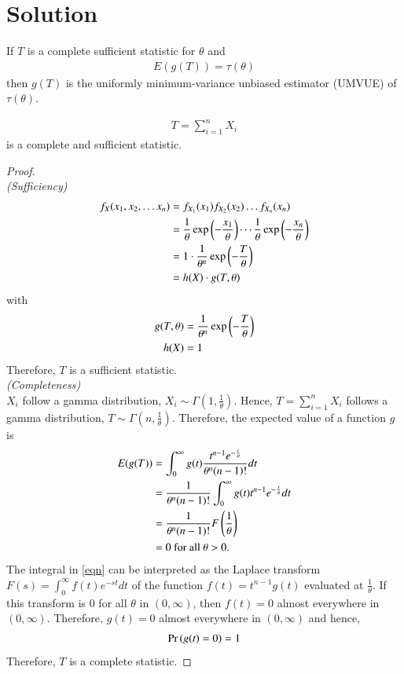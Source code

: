\documentclass[journal,12pt,twocolumn]{IEEEtran}
\begin{document}
\section{Solution}
\begin{theorem}
If $T$ is a complete sufficient statistic for $\theta$ and 
\begin{align}
\label{eqn 2.0.1}
E(g(T)) = \tau(\theta)
\end{align}
then $g(T)$ is the uniformly minimum-variance unbiased estimator (UMVUE) of $\tau(\theta)$.\\
\end{theorem}
\begin{lemma}
\begin{align}
T = \sum_{i=1}^{n} X_i
\end{align}
is a complete and sufficient statistic. 
\end{lemma}
\begin{proof}~\\
\textit{(Sufficiency)}
\begin{align}
f_{X}(x_1, x_2, \ldots x_n) &= f_{X_1}(x_1)f_{X_2}(x_2) \ldots f_{X_n}(x_n)\\
&= \dfrac{1}{\theta} \exp\left(-\dfrac{x_1}{\theta}\right) \cdots \dfrac{1}{\theta} \exp\left(-\dfrac{x_n}{\theta}\right)\\
&= 1 \cdot \dfrac{1}{\theta^n} \exp\left(-\dfrac{T}{\theta}\right)\\
&= h(X) \cdot g(T, \theta) 
\end{align}
with 
\begin{align}
g(T, \theta) &= \dfrac{1}{\theta^n} \exp\left(-\dfrac{T}{\theta}\right)\\
h(X) &= 1
\end{align}
Therefore, $T$ is a sufficient statistic.\\
\textit{(Completeness)}\\
$X_i$ follow a gamma distribution, $X_i \sim \Gamma (1, \frac{1}{\theta})$. Hence, $T = \sum_{i=1}^n X_i $ follows a gamma distribution, $T \sim \Gamma (n, \frac{1}{\theta})$. Therefore, the expected value of a function $g$ is
\begin{align}
E(g(T)) &= 
\int_0 ^{\infty} g(t) \dfrac{t^{n-1} e^{-\frac{t}{\theta}}}{\theta^n(n-1)!} dt\\ \label{eqn}
&= \frac{1}{\theta^n (n-1)!} \int_0 ^{\infty} g(t) t^{n-1} e^{-\frac{t}{\theta}} dt\\ 
&= \frac{1}{\theta^n (n-1)!} F \left(\frac{1}{\theta}\right)\\
&= 0 \text{ for all } \theta > 0.
\end{align}
The integral in \eqref{eqn} can be interpreted as the Laplace transform $F(s) = \int_0 ^{\infty} f(t)e^{-st} dt $ of the function $ f(t) = t^{n-1}g(t)$ evaluated at $\frac{1}{\theta}$. If this transform is $0$ for all $\theta$ in $(0, \infty)$, then $f(t)=0$ almost everywhere in $(0,\infty)$. Therefore, $g(t) = 0$ almost everywhere in $(0, \infty)$ and hence, 
\begin{align}
\Pr\left(g(t)=0\right) = 1
\end{align}
Therefore, $T$ is a complete statistic.
\end{proof}
\end{document}
